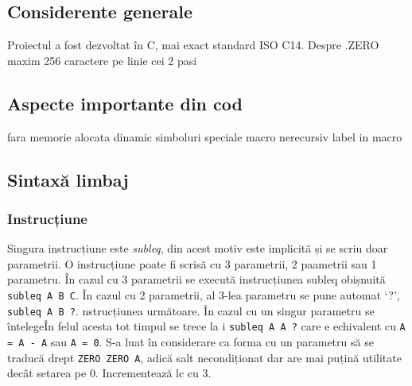 \documentclass[../main.tex]{subfiles}
\begin{document}
\subsection{Considerente generale}
Proiectul a fost dezvoltat în C, mai exact standard ISO C14.
Despre .ZERO
maxim 256 caractere pe linie
cei 2 pasi

\subsection{Aspecte importante din cod}
fara memorie alocata dinamic
simboluri speciale
macro nerecursiv
label in macro

\subsection{Sintaxă limbaj}
\subsubsection{Instrucțiune}
Singura instrucțiune este \emph{subleq}, din acest motiv este implicită și se scriu doar parametrii. O instrucțiune
poate fi scrisă cu 3 parametrii, 2 paametrii sau 1 parametru. În cazul cu 3 parametrii se execută instrucțiunea subleq
obișnuită \texttt{subleq A B C}. În cazul cu 2 parametrii, al 3-lea parametru se pune automat `?', \texttt{subleq A B ?}.
nstrucțiunea următoare. În cazul cu un singur parametru se întelegeÎn felul acesta tot timpul se trece la i
\texttt{subleq A A ?} care e echivalent cu \texttt{A = A - A} sau \texttt{A = 0}. S-a luat în considerare ca
forma cu un parametru să se traducă drept \texttt{ZERO ZERO A}, adică salt necondiționat dar are mai puțină
utilitate decât setarea pe 0. Incrementează \acrshort{lc} cu 3.
\end{document}
